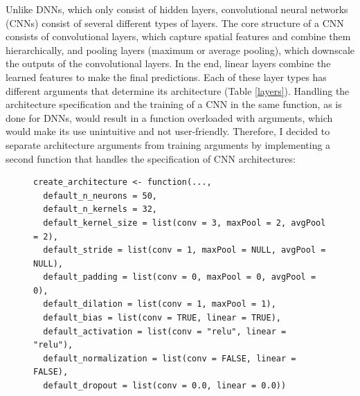 \documentclass[12pt,twoside]{scrreport}
\begin{document}
Unlike DNNs, which only consist of hidden layers, convolutional neural networks (CNNs) consist of several different types of layers. The core structure of a CNN consists of convolutional layers, which capture spatial features and combine them hierarchically, and pooling layers (maximum or average pooling), which downscale the outputs of the convolutional layers. In the end, linear layers combine the learned features to make the final predictions. Each of these layer types has different arguments that determine its architecture (Table \ref{layers}). Handling the architecture specification and the training of a CNN in the same function, as is done for DNNs, would result in a function overloaded with arguments, which would make its use unintuitive and not user-friendly. Therefore, I decided to separate architecture arguments from training arguments by implementing a second function that handles the specification of CNN architectures:

\begin{figure}[h]
	\centering
	\newsavebox{\lstbox} %
	\begin{lrbox}{\lstbox}
		\begin{lstlisting}
create_architecture <- function(...,
  default_n_neurons = 50,
  default_n_kernels = 32,
  default_kernel_size = list(conv = 3, maxPool = 2, avgPool = 2),
  default_stride = list(conv = 1, maxPool = NULL, avgPool = NULL),
  default_padding = list(conv = 0, maxPool = 0, avgPool = 0),
  default_dilation = list(conv = 1, maxPool = 1),
  default_bias = list(conv = TRUE, linear = TRUE),
  default_activation = list(conv = "relu", linear = "relu"),
  default_normalization = list(conv = FALSE, linear = FALSE),
  default_dropout = list(conv = 0.0, linear = 0.0))
		\end{lstlisting}
	\end{lrbox}
	\resizebox{\textwidth}{!}{\usebox{\lstbox}}
\end{figure}
\end{document}
